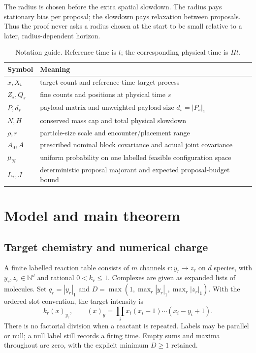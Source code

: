 \documentclass[11pt]{article}
\numberwithin{equation}{section}
\theoremstyle{definition}
\theoremstyle{remark}\newtheorem{remark}[theorem]{Remark}
\newcommand{\N}{\mathbb N}
\newcommand{\K}{\mathcal K}
\begin{document}
The radius is chosen before the extra spatial slowdown. The radius pays
stationary bias per proposal; the slowdown pays relaxation between proposals.
Thus the proof never asks a radius chosen at the start to be small relative
to a later, radius-dependent horizon.

\begin{table}[htbp]
\centering\small
\begin{tabular}{@{}p{}p{}@{}}
\toprule
Symbol & Meaning\\\midrule
$x,X_t$ & target count and reference-time target process\\
$Z_s,Q_s$ & fine counts and positions at physical time $s$\\
$P,d_s$ & payload matrix and unweighted payload size $d_s=|P_s|_1$\\
$N,H$ & conserved mass cap and total physical slowdown\\
$\rho,r$ & particle-size scale and encounter/placement range\\
$A_0,A$ & prescribed nominal block covariance and actual joint covariance\\
$\mu_\K$ & uniform probability on one labelled feasible configuration space\\
$L_*,J$ & deterministic proposal majorant and expected proposal-budget bound\\
\bottomrule
\end{tabular}
\caption{Notation guide. Reference time is $t$; the corresponding physical
time is $Ht$.}
\end{table}
\clearpage



\section{Model and main theorem}
\label{sec:model}

\subsection{Target chemistry and numerical charge}

A finite labelled reaction table consists of $m$ channels
$r:y_r\to z_r$ on $d$ species, with $y_r,z_r\in\N^d$ and
rational $0<k_r\le1$. Complexes are given as expanded lists of molecules.
Set $q_r=|y_r|_1$ and
$D=\max(1,\max_r|y_r|_1,\max_r|z_r|_1)$. With the ordered-slot convention,
the target intensity is
\begin{equation}\label{eq:target}
 k_r(x)_{y_r},\qquad (x)_y=\prod_i x_i(x_i-1)\cdots(x_i-y_i+1).
\end{equation}
There is no factorial division when a reactant is repeated. Labels may be
parallel or null; a null label still records a firing time.
Empty sums and maxima throughout are zero, with the explicit minimum
$D\ge1$ retained.
\end{document}
